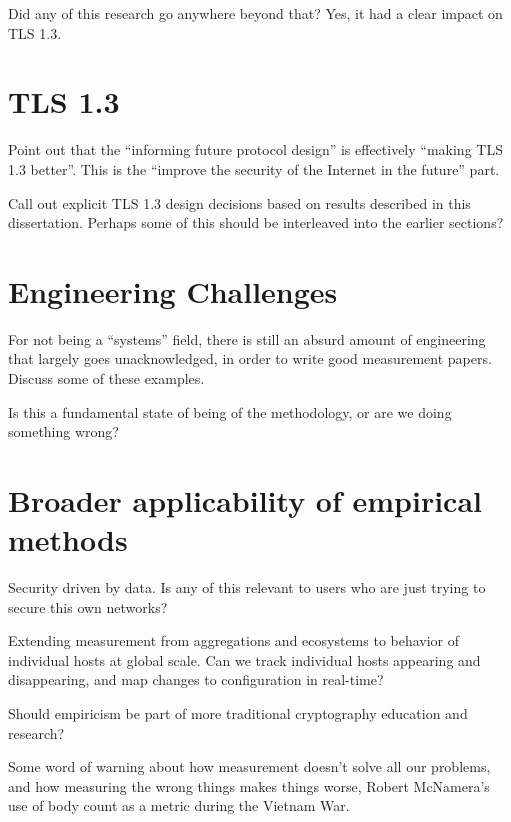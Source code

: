 \documentclass[doublespace]{styles/rackham-thesis}
\begin{document}
Did any of this research go anywhere beyond that? Yes, it had a clear impact
on TLS 1.3.

\section{TLS 1.3}

Point out that the ``informing future protocol design'' is effectively
``making TLS 1.3 better''. This is the ``improve the security of the Internet
in the future'' part.

Call out explicit TLS 1.3 design decisions based on results described in this
dissertation. Perhaps some of this should be interleaved into the earlier
sections?

\section{Engineering Challenges}

For not being a ``systems'' field, there is still an absurd amount of
engineering that largely goes unacknowledged, in order to write good
measurement papers. Discuss some of these examples.

Is this a fundamental state of being of the methodology, or are we doing something wrong?

\section{Broader applicability of empirical methods}

Security driven by data. Is any of this relevant to users who are just trying
to secure this own networks?

Extending measurement from aggregations and ecosystems to behavior of
individual hosts at global scale. Can we track individual hosts appearing and
disappearing, and map changes to configuration in real-time?

Should empiricism be part of more traditional cryptography education and research?

Some word of warning about how measurement doesn't solve all our problems,
and how measuring the wrong things makes things worse, \eg Robert McNamera's
use of body count as a metric during the Vietnam War.




\end{document}
